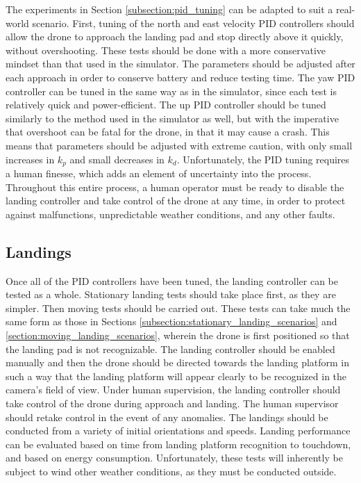 The experiments in Section \ref{subsection:pid_tuning} can be adapted to suit a real-world scenario. First, tuning of the north and east velocity PID controllers should allow the drone to approach the landing pad and stop directly above it quickly, without overshooting. These tests should be done with a more conservative mindset than that used in the simulator. The parameters should be adjusted after each approach in order to conserve battery and reduce testing time. The yaw PID controller can be tuned in the same way as in the simulator, since each test is relatively quick and power-efficient. The up PID controller should be tuned similarly to the method used in the simulator as well, but with the imperative that overshoot can be fatal for the drone, in that it may cause a crash. This means that parameters should be adjusted with extreme caution, with only small increases in $k_p$ and small decreases in $k_d$. Unfortunately, the PID tuning requires a human finesse, which adds an element of uncertainty into the process. Throughout this entire process, a human operator must be ready to disable the landing controller and take control of the drone at any time, in order to protect against malfunctions, unpredictable weather conditions, and any other faults.

\subsection{Landings}

Once all of the PID controllers have been tuned, the landing controller can be tested as a whole. Stationary landing tests should take place first, as they are simpler. Then moving tests should be carried out. These tests can take much the same form as those in Sections \ref{subsection:stationary_landing_scenarios} and \ref{section:moving_landing_scenarios}, wherein the drone is first positioned so that the landing pad is not recognizable. The landing controller should be enabled manually and then the drone should be directed towards the landing platform in such a way that the landing platform will appear clearly to be recognized in the camera's field of view. Under human supervision, the landing controller should take control of the drone during approach and landing. The human supervisor should retake control in the event of any anomalies. The landings should be conducted from a variety of initial orientations and speeds. Landing performance can be evaluated based on time from landing platform recognition to touchdown, and based on energy consumption. Unfortunately, these tests will inherently be subject to wind other weather conditions, as they must be conducted outside. 